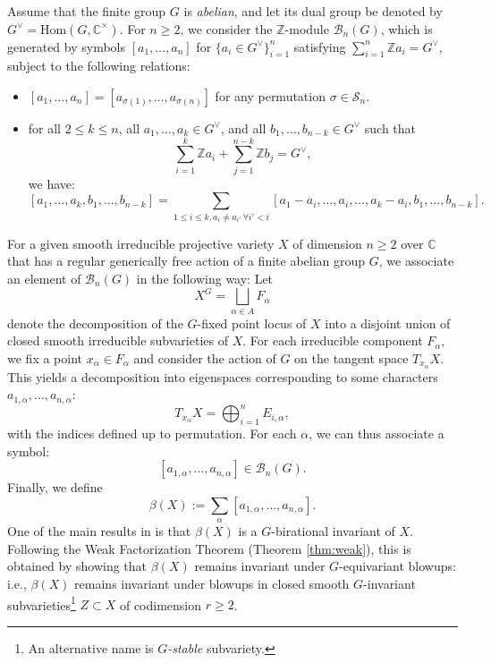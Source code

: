 \documentclass[12pt,a4paper]{amsart}
\theoremstyle{definition}
\theoremstyle{remark}
\begin{document}
Assume that the finite group \(G\) is \textit{abelian}, and let its dual group be denoted by \(G^{\vee} = \mathrm{Hom}(G, \mathbb{C}^{\times})\). For \(n \geq 2\), we consider the \(\mathbb{Z}\)-module \(\mathcal{B}_n(G)\), which is generated by symbols \([a_1, \ldots, a_n]\) for \(\{a_i \in G^{\vee}\}_{i=1}^n\) satisfying \( \sum_{i=1}^n \mathbb{Z} a_i = G^{\vee}\), subject to the following relations:
\begin{itemize}
    \item[(O)] \([a_1, \ldots, a_n] = [a_{\sigma(1)}, \ldots, a_{\sigma(n)}]\) for any permutation \(\sigma \in {\mathcal S}_n\).
    \item[(B)] for all \(2 \leq k \leq n\), all \(a_1, \ldots, a_k \in G^{\vee}\), and all \(b_1, \ldots, b_{n-k} \in G^{\vee}\) such that
    \[
    \sum_{i=1}^k \mathbb{Z} a_i + \sum_{j=1}^{n-k} \mathbb{Z} b_j = G^{\vee},
    \]
    we have:
    \[
    [a_1, \ldots, a_k, b_1, \ldots, b_{n-k}] = \sum_{1 \leq i \leq k, a_i \neq a_{i'}\,\forall i'<i} [a_1 - a_i, \ldots, a_i, \ldots, a_k - a_i, b_1, \ldots, b_{n-k}].
    \]
\end{itemize}

For a given smooth irreducible projective variety \(X\) of dimension \(n \geq 2\) over \(\mathbb{C}\) that has a regular generically free action of a finite abelian group \(G\), we associate an element of \(\mathcal{B}_n(G)\) in the following way: Let
\[
X^G = \bigsqcup_{\alpha \in A} F_{\alpha}
\]
denote the decomposition of the $G$-fixed point locus of $X$ into a disjoint union of closed smooth irreducible subvarieties of \(X\). For each irreducible component \(F_{\alpha}\), we fix a point \(x_{\alpha} \in F_{\alpha}\) and consider the action of \(G\) on the tangent space \(T_{x_{\alpha}}X\). This yields a decomposition into eigenspaces corresponding to some characters \(a_{1,\alpha}, \ldots, a_{n,\alpha}\):
\[
T_{x_{\alpha}} X = \bigoplus_{i=1}^{n} E_{i,\alpha},
\]
with the indices defined up to permutation. For each \(\alpha\), we can thus associate a symbol:
\[
[a_{1,\alpha}, \ldots, a_{n,\alpha}] \in \mathcal{B}_n(G).
\]
Finally, we define 
\[
\beta(X) := \sum_{\alpha} [a_{1,\alpha}, \ldots, a_{n,\alpha}].
\]
One of the main results in \cite{kontsevich2021equivariant} is that \(\beta(X)\) is a \(G\)-birational invariant of \(X\). Following the Weak Factorization Theorem (Theorem \ref{thm:weak}), this is obtained by showing that \(\beta(X)\) remains invariant under \(G\)-equivariant blowups: i.e., $\beta(X)$ remains invariant under blowups in closed smooth \(G\)-invariant subvarieties\footnote{An alternative name is \textit{\(G\)-stable} subvariety.} \(Z \subset X\) of codimension \(r \geq 2\).
\end{document}
